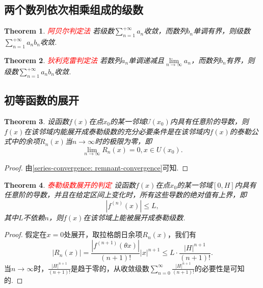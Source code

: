 \documentclass{article}
\newtheorem{theorem}{Theorem}[section]
\newcommand{\redt}[1]{\textcolor{red}{#1}}
\begin{document}
\subsection{两个数列依次相乘组成的级数}


\begin{theorem}
\rm \redt{阿贝尔判定法} 若级数$\sum\limits_{n=1}^{+\infty}a_n$收敛，而数列$b_n$单调有界，则级数$\sum\limits_{n=1}^{+\infty}a_nb_n$收敛. 
\end{theorem}

\begin{theorem}
\rm \redt{狄利克雷判定法} 若数列$a_n$单调递减且$\lim\limits_{n \to \infty} a_n$，而数列$b_n$有界，则级数$\sum\limits_{n=1}^{+\infty} a_nb_n$收敛. 
\end{theorem}

\newpage
\subsection{初等函数的展开}

\begin{theorem}
\rm 设函数$f(x)$在点$x_0$的某一邻域$U(x_0)$内具有任意阶的导数，则$f(x)$在该邻域内能展开成泰勒级数的充分必要条件是在该邻域内$f(x)$的泰勒公式中的余项$R_n(x)$当$n \to \infty$时的极限为零，即
$$
\lim\limits_{n \to \infty} R_n(x) = 0, x \in U(x_0).
$$
\end{theorem}

\begin{proof}
由\ref{series-convergence: remnant-convergence}可知. 
\end{proof}

\begin{theorem}
\rm \redt{泰勒级数展开的判定} 设函数$f(x)$在点$x_0$的某一邻域$[0,H]$内具有任意阶的导数，并且在给定区间上变化时，所有这些导数的绝对值有上界，即
$$
|f^{(n)}(x)| \leq L,
$$
其中$L$不依赖$n$，则$f(x)$在该邻域上能被展开成泰勒级数. 
\end{theorem}

\begin{proof}
假定在$x=0$处展开，取拉格朗日余项$R_n(x)$，我们有
$$
|R_n(x)| = \frac{|f^{(n+1)}(\theta x)|}{(n+1)!}|x|^{n+1} \leq L \cdot \frac{|H|^{n+1}}{(n+1)!}.
$$
当$n \to \infty$时，$\frac{|H|^{n+1}}{(n+1)!}$是趋于零的，从收敛级数$\sum\limits_{n=0}^{\infty} \frac{|H|^{n+1}}{(n+1)!}$的必要性是可知的. 
\end{proof}
\end{document}
